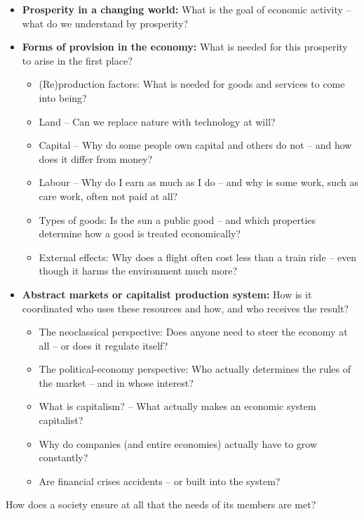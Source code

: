 \documentclass[
  british,
  a4paper,
  DIV=11,
  numbers=noendperiod,
  oneside,
  openany]{scrreprt}
\begin{document}
\begin{itemize}
\item
  \textbf{Prosperity in a changing world:} What is the goal of economic
  activity -- what do we understand by prosperity?
\item
  \textbf{Forms of provision in the economy:} What is needed for this
  prosperity to arise in the first place?

  \begin{itemize}
  \item
    (Re)production factors: What is needed for goods and services to
    come into being?
  \item
    Land -- Can we replace nature with technology at will?
  \item
    Capital -- Why do some people own capital and others do not -- and
    how does it differ from money?
  \item
    Labour -- Why do I earn as much as I do -- and why is some work,
    such as care work, often not paid at all?
  \item
    Types of goods: Is the sun a public good -- and which properties
    determine how a good is treated economically?
  \item
    External effects: Why does a flight often cost less than a train
    ride -- even though it harms the environment much more?
  \end{itemize}
\item
  \textbf{Abstract markets or capitalist production system:} How is it
  coordinated who uses these resources and how, and who receives the
  result?

  \begin{itemize}
  \item
    The neoclassical perspective: Does anyone need to steer the economy
    at all -- or does it regulate itself?
  \item
    The political-economy perspective: Who actually determines the rules
    of the market -- and in whose interest?
  \item
    What is capitalism? -- What actually makes an economic system
    capitalist?
  \item
    Why do companies (and entire economies) actually have to grow
    constantly?
  \item
    Are financial crises accidents -- or built into the system?
  \end{itemize}
\end{itemize}

\begin{tcolorbox}[enhanced jigsaw, arc=.35mm, bottomrule=.15mm, bottomtitle=1mm, breakable, colback=white, colbacktitle=quarto-callout-note-color!10!white, colframe=quarto-callout-note-color-frame, coltitle=black, left=2mm, leftrule=.75mm, opacityback=0, opacitybacktitle=0.6, rightrule=.15mm, title={Overarching guiding question of this chapter}, titlerule=0mm, toprule=.15mm, toptitle=1mm]

How does a society ensure at all that the needs of its members are met?

\end{tcolorbox}
\end{document}
